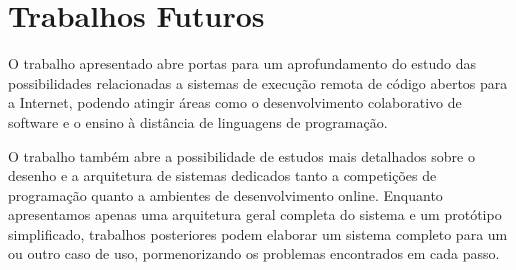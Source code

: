 \documentclass[ruledheader, 12pt]{abnt}
\begin{document}
\section{Trabalhos Futuros}

O trabalho apresentado abre portas para um aprofundamento do estudo das possibilidades relacionadas a sistemas de execução remota de código abertos para a Internet, podendo atingir áreas como o desenvolvimento colaborativo de software e o ensino à distância de linguagens de programação.

O trabalho também abre a possibilidade de estudos mais detalhados sobre o desenho e a arquitetura de sistemas dedicados tanto a competições de programação quanto a ambientes de desenvolvimento online. Enquanto apresentamos apenas uma arquitetura geral completa do sistema e um protótipo simplificado, trabalhos posteriores podem elaborar um sistema completo para um ou outro caso de uso, pormenorizando os problemas encontrados em cada passo.


\end{document}
